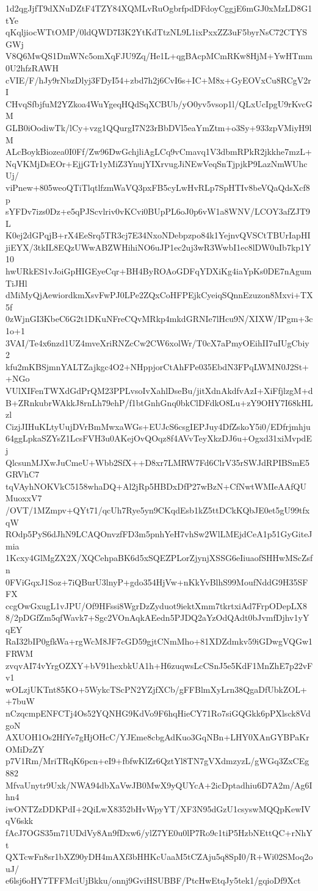 1d2qgJjfT9dXNuDZtF4TZY84XQMLvRuOgbrfpdDFdoyCggjE6mGJ0xMzLD8G1tYe
qKqljiocWTtOMP/0ldQWD7I3K2YtKdTtzNL9L1ixPxxZZ3uF5byrNsC72CTYSGWj
V8Q6MwQS1DmWNc5omXqFJU9Zq/He1L+qgBAcpMCmRKw8HjM+YwHTmm0U2hfzRAWH
cVIE/F/hJy9rNbzDlyj3FDyI54+zbd7h2j6CvI6s+IC+M8x+GyEOVxCu8RCgV2rI
CHvqSfbjfuM2YZkoa4WuYgeqHQdSqXCBUb/yO0yv5vsop1l/QLxUcIpgU9rKvcGM
GLB0iOodiwTk/lCy+vzg1QQurgI7N23rBbDVl5eaYmZtm+o3Sy+933zpVMiyH9lM
ALcBoykBiozea0I0Ff/Zw96DwGchjliAgLCq9vCmavq1V3dbmRPkR2jkkhe7mzL+
NqVKMjDsEOr+EjjGTr1yMiZ3YnujYIXrvugJiNEwVeqSnTjpjkP9LazNmWUhcUj/
viPnew+805weoQTiTlqtlfzmWaVQ3pxFB5cyLwHvRLp7SpHTIv8beVQaQdsXcf8p
sYFDv7izs0Dz+e5qPJScvlriv0vKCvi0BUpPL6oJ0p6vW1a8WNV/LCOY3afZJT9L
K0ej2dGPqjB+rX4EeSrq5TR3cj7E34NxoNDebpzpo84k1YejnvQVSCtTBUrIapHI
jiEYX/3tkIL8EQzUWwABZWHihiNO6uJP1ec2uj3wR3WwbI1ec8lDW0uIb7kp1Y10
hwURkES1vJoiGpHIGEyeCqr+BH4ByROAoGDFqYDXiKg4iaYpKs0DE7nAgumTiJHl
dMiMyQjAewiordkmXsvFwPJ0LPe2ZQxCoHFPEjkCyeiqSQnnEzuzon8Mxvi+TX5f
0zWjnGI3KbeC6G2t1DKuNFreCQvMRkp4mkdGRNIe7lHcu9N/XIXW/IPgm+3c1o+1
3VAI/Te4x6nzd1UZ4mveXriRNZcCw2CW6xolWr/T0cX7aPmyOEihII7uIUgCbiy2
kfu2mKBSjmnYALTZajkgc4O2+NHppjorCtAhFPe035EbdN3FPqLWMN0J2St++NGo
VUlXIFenTWXdGdPrQM23PPLvsoIvXahlDseBu/jitXdnAkdfvAzI+XiFfjlzgM+d
B+ZRnkubrWAkkJ8rnLh79ehP/f1btGnhGnq0bkClDFdkO8Lu+zY9OHY7I68kHLzl
CizjJIHuKLtyUujDVrBmMwxaWGs+EUJcS6csgIEPJuy4DfZskoY5i0/EDfrjmhju
64ggLpkaSZYsZ1LcsFVH3u0AKejOvQOqz8f4AVvTeyXkzDJ6u+Ogxd31xiMvpdEj
QlcsunMJXwJuCmeU+Wbb2SfX++D8xr7LMRW7Fd6ClrV35rSWJdRPIBSmE5GRVhC7
tqVAyhNOKVkC5158whaDQ+Al2jRp5HBDxDfP27wBzN+CfNwtWMIeAAfQUMuoxxV7
/OVT/1MZmpv+QYt71/qcUh7Rye5yn9CKqdEsb1kZ5ttDCkKQbJE0et5gU99tfxqW
ROdp5PyS6dJhN9LCAQOnvzfFD3m5pnhYeH7vhSw2WlLMEjdCeA1p51GyGiteJmia
1Kcxy4GlMgZX2X/XQCehpaBK6d5xSQEZPLorZjynjXSSG6eIiuaofSHHwMScZsfn
0FViGqxJ1Soz+7iQBurU3lnyP+gdo354HjVw+nKkYvBlhS99MoufNddG9H35SFFX
ccgOwGxugL1vJPU/Of9HFssi8WgrDzZyduot9iektXmm7tkrtxiAd7FrpODepLX8
8/2pDGfZm5qfWavk7+Sgc2VOnAqkAEedn5PJDQ2aYzOdQAdt0bJvmfDjhv1yYqEY
RaI32bIP0gfkWa+rgWcM8JF7cGD59gjtCNmMho+81XDZdmkv59iGDwgVQGw1FRWM
zvqvAI74vYrgOZXY+bV91hexbkUA1h+H6zuqwsLcCSnJ5e5KdF1MnZhE7p22vFv1
wOLzjUKTnt85KO+5WykcTScPN2YZjfXCb/gFFBlmXyLrn38QgaDfUbkZOL++7buW
nCzqcmpENFCTj4Os52YQNHG9KdVo9F6hqHieCY71Ro7siGQGkk6pPXlsck8VdgoN
AXUOH1Os2HfYe7gHjOHcC/YJEme8cbgAdKuo3GqNBn+LHY0XAnGYBPaKrOMiDzZY
p7V1Rm/MriTRqK6pcn+eI9+fbfwKlZr6QztYl8TN7gVXdmzyzL/gWGq3ZxCEg882
MfvaUnytr9Uxk/NWA94dbXaVwJB0MwX9yQUYcA+2icDptadhiu6D7A2m/Ag6Ihn4
iwONTZzDDKPdI+2QiLwX8352bHvWpyYT/XF3N95dGzU1csyswMQQpKewIVqV6skk
fAcJ7OGS35m71UDdVy8An9fDxw6/ylZ7YE0u0lP7Ro9c1tiP5HzbNEttQC+rNhYt
QXTcwFn8sr1bXZ90yDH4mAXf3bHHKcUaaM5tCZAju5q8SpI0/R+Wi02SMoq2ouJ/
e6lsj6oHY7TFFMciUjBkku/onnj9GviHSUBBF/PtcHwEtqJy5tek1/gqioDf9Xct
